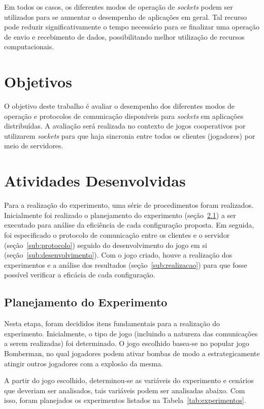 \documentclass[12pt]{article}
\begin{document}
Em todos os casos, os diferentes modos de operação de \emph{sockets} podem ser utilizados para se aumentar o desempenho de aplicações em geral. Tal recurso pode reduzir significativamente o tempo necessário para se finalizar uma operação de envio e recebimento de dados, possibilitando melhor utilização de recursos computacionais.

\section{Objetivos} \label{sec:objetivos}

O objetivo deste trabalho é avaliar o desempenho dos diferentes modos de
operação e protocolos de comunicação disponíveis para \emph{sockets} em
aplicações distribuídas. A avaliação será realizada no contexto de jogos
cooperativos por utilizarem \emph{sockets} para que haja sincronia entre todos
os clientes (jogadores) por meio de servidores.

\section{Atividades Desenvolvidas} \label{sec:atividades}

Para a realização do experimento, uma série de procedimentos foram realizados.
Inicialmente foi realizado o planejamento do experimento
(seção~\ref{sub:planejamento}) a ser executado para análise da eficiência de
cada configuração proposta. Em seguida, foi especificado o protocolo de
comunicação entre os clientes e o servidor (seção~\ref{sub:protocolo}) seguido
do desenvolvimento do jogo em si (seção~\ref{sub:desenvolvimento}). Com o jogo
criado, houve a realização dos experimentos e a análise dos resultados
(seção~\ref{sub:realizacao}) para que fosse possível verificar a eficácia de
cada configuração.

\subsection{Planejamento do Experimento} \label{sub:planejamento}

Nesta etapa, foram decididos itens fundamentais para a realização do
experimento. Inicialmente, o tipo de jogo (incluindo a natureza das
comunicações a serem realizadas) foi determinado. O jogo escolhido basea-se no
popular jogo Bomberman, no qual jogadores podem ativar bombas de modo a
estrategicamente atingir outros jogadores com a explosão da mesma.

A partir do jogo escolhido, determinou-se as variáveis do experimento e
cenários que deveriam ser analisados, tais variáveis podem ser analisadas
abaixo. Com isso, foram planejados os experimentos listados na Tabela~\ref{tab:experimentos}.
\end{document}
